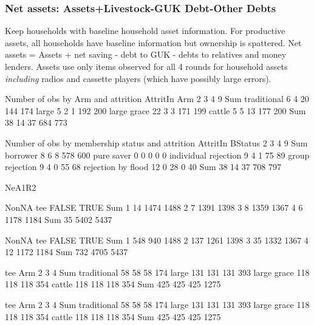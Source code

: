 \subsubsection{Net assets: Assets+Livestock-GUK Debt-Other Debts}

Keep households with baseline household asset information. For productive assets, all households have baseline information but ownership is spattered. Net assets = Assets + net saving - debt to GUK - debts to relatives and money lenders. Assets use only items observed for all 4 rounds for household assets \textit{including} radios and cassette players (which have possibly large errors). 


\begin{Schunk}
\begin{Soutput}


Number of obs by Arm and attrition
             AttritIn
Arm             2   3   4   9 Sum
  traditional   6   4  20 144 174
  large         5   2   1 192 200
  large grace  22   3   3 171 199
  cattle        5   5  13 177 200
  Sum          38  14  37 684 773


Number of obs by membership status and attrition
                      AttritIn
BStatus                  2   3   4   9 Sum
  borrower               8   6   8 578 600
  pure saver             0   0   0   0   0
  individual rejection   9   4   1  75  89
  group rejection        9   4   0  55  68
  rejection by flood    12   0  28   0  40
  Sum                   38  14  37 708 797
\end{Soutput}
\end{Schunk}


\begin{Schunk}
\begin{Soutput}
NeA1R2
\end{Soutput}
\begin{Soutput}
     NonNA
tee   FALSE TRUE  Sum
  1      14 1474 1488
  2       7 1391 1398
  3       8 1359 1367
  4       6 1178 1184
  Sum    35 5402 5437
\end{Soutput}
\begin{Soutput}
     NonNA
tee   FALSE TRUE  Sum
  1     548  940 1488
  2     137 1261 1398
  3      35 1332 1367
  4      12 1172 1184
  Sum   732 4705 5437
\end{Soutput}
\begin{Soutput}
             tee
Arm              2    3    4  Sum
  traditional   58   58   58  174
  large        131  131  131  393
  large grace  118  118  118  354
  cattle       118  118  118  354
  Sum          425  425  425 1275
\end{Soutput}
\begin{Soutput}
             tee
Arm              2    3    4  Sum
  traditional   58   58   58  174
  large        131  131  131  393
  large grace  118  118  118  354
  cattle       118  118  118  354
  Sum          425  425  425 1275
\end{Soutput}
\end{Schunk}









